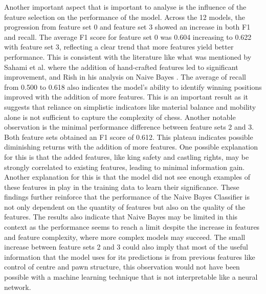 Another important aspect that is important to analyse is the influence of the feature selection on the performance of the model. Across the 12 models, the progression from feature set 0 and feature set 3 showed an increase in both F1 and recall. The average F1 score for feature set 0 was 0.604 increasing to 0.622 with feature set 3, reflecting a clear trend that more features yield better performance. This is consistent with the literature like what was mentioned by Sahami et al. \cite{sahamiBayesianApproachFiltering} where the addition of hand-crafted features led to significant improvement,  and Rish in his analysis on Naive Bayes \cite{rishEmpiricalStudyNaive}. The average of recall from 0.500 to 0.618 also indicates the model's ability to identify winning positions improved with the addition of more features. This is an important result as it suggests that reliance on simplistic indicators like material balance and mobility alone is not sufficient to capture the complexity of chess. Another notable observation is the minimal performance difference between feature sets 2 and 3. Both feature sets obtained an F1 score of 0.612. This plateau indicates possible diminishing returns with the addition of more features. One possible explanation for this is that the added features, like king safety and castling rights, may be strongly correlated to existing features, leading to minimal information gain. Another explanation for this is that the model did not see enough examples of these features in play in the training data to learn their significance. These findings further reinforce that the performance of the Naive Bayes Classifier is not only dependent on the quantity of features but also on the quality of the features. The results also indicate that Naive Bayes may be limited in this context as the performance seems to reach a limit despite the increase in features and feature complexity, where more complex models may succeed. The small increase between feature sets 2 and 3 could also imply that most of the useful information that the model uses for its predictions is from previous features like control of centre and pawn structure, this observation would not have been possible with a machine learning technique that is not interpretable like a neural network. 


